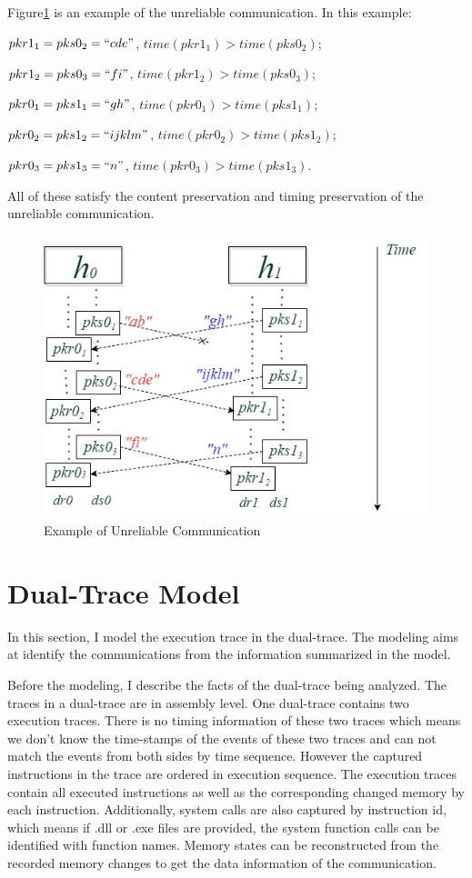 Figure\ref{unreliableexample} is an example of the unreliable communication. In this example:

$pkr1_1 = pks0_2=``cde"$, $time(pkr1_1) > time(pks0_2)$; 

$pkr1_2 = pks0_3=``fi"$, $time(pkr1_2) > time(pks0_3)$;

$pkr0_1 = pks1_1=``gh"$, $time(pkr0_1) > time(pks1_1)$;

$pkr0_2 = pks1_2=``ijklm"$, $time(pkr0_2) > time(pks1_2)$;

$pkr0_3 = pks1_3=``n"$, $time(pkr0_3) > time(pks1_3)$.

All of these satisfy the content preservation and timing preservation of the unreliable communication.
\begin{figure}[H]
\centerline{\includegraphics[scale=0.55]{Figures/unreliableexample}}
\caption{Example of Unreliable Communication}
\label{unreliableexample}
\end{figure}

\section{Dual-Trace Model}
In this section, I model the execution trace in the dual-trace. The modeling aims at identify the communications from the information summarized in the model. 

Before the modeling, I describe the facts of the dual-trace being analyzed. The traces in a dual-trace are in assembly level. One dual-trace contains two execution traces. There is no timing information of these two traces which means we don't know the time-stamps of the events of these two traces and can not match the events from both sides by time sequence. However the captured instructions in the trace are ordered in execution sequence. The execution traces contain all executed instructions as well as the corresponding changed memory by each instruction. Additionally, system calls are also captured by instruction id, which means if .dll or .exe files are provided, the system function calls can be identified with function names. Memory states can be reconstructed from the recorded memory changes to get the data information of the communication. 


